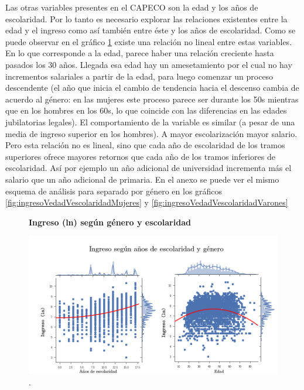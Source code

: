 Las otras variables presentes en el CAPECO son la edad y los años de escolaridad. Por lo tanto es necesario explorar las relaciones existentes entre la edad y el ingreso como así también entre éste y los años de escolaridad. Como se puede observar en el gráfico \ref{fig:ingresoVedadVescolaridad} existe una relación no lineal entre estas variables. En lo que corresponde a la edad, parece haber una relación creciente hasta pasados los 30 años. Llegada esa edad hay un amesetamiento por el cual no hay incrementos salariales a partir de la edad, para luego comenzar un proceso descendente (el año que inicia el cambio de tendencia hacia el descenso cambia de acuerdo al género: en las mujeres este proceso parece ser durante los 50s mientras que en los hombres en los 60s, lo que coincide con las diferencias en las edades jubilatorias legales). El comportamiento de la variable es similar (a pesar de una media de ingreso superior en los hombres). A mayor escolarización mayor salario. Pero esta relación no es lineal, sino que cada año de escolaridad de los tramos superiores ofrece mayores retornos que cada año de los tramos inferiores de escolaridad. Así por ejemplo un año adicional de universidad incrementa más el salario que un año adicional de primaria. En el anexo se puede ver el mismo esquema de análisis para separado por género en los gráficos \ref{fig:ingresoVedadVescolaridadMujeres} y \ref{fig:ingresoVedadVescolaridadVarones}

\begin{figure}[!htb]
	\textbf{Ingreso (ln) según género y escolaridad}\par\medskip
	\includegraphics[scale = 0.4]{../img/capitulo3/ingresoVedadVescolaridad.png}
	\caption{.}
	\label{fig:ingresoVedadVescolaridad}
\end{figure}


